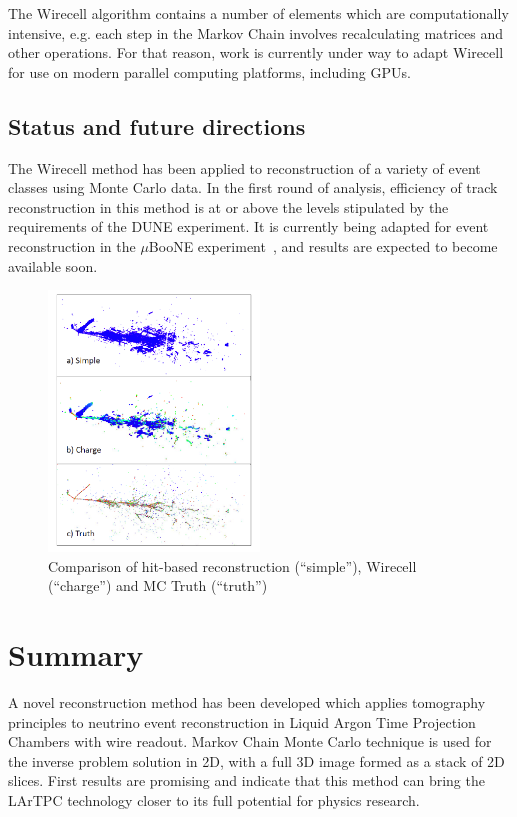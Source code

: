 \documentclass[a4paper]{jpconf}
\begin{document}
The Wirecell algorithm contains a number of elements which are computationally intensive, e.g. each step in the Markov Chain involves recalculating
matrices and other operations. For that reason, work is currently under way to adapt Wirecell for use on modern parallel computing platforms,
including GPUs.

\subsection{Status and future directions}
The Wirecell method has been applied to reconstruction of a variety of event classes using Monte Carlo data. In the first round of analysis,
efficiency of track reconstruction in this method is at or above the levels stipulated by the requirements of the DUNE experiment.
It is currently being adapted for
event reconstruction in the $\mu$BooNE experiment~\cite{uboone}, and results are expected to become available soon.
\begin{figure}[h!]
	\centering
	\includegraphics[width=0.5\textwidth]{wirecell_vs_mc.png}
	\caption{Comparison of hit-based reconstruction (``simple''), Wirecell (``charge'') and MC Truth (``truth'')}
	\label{fig:wirecell_vs_mc}
\end{figure}



\section{Summary}
A novel reconstruction method has been developed which applies tomography principles to
neutrino event reconstruction in Liquid Argon Time Projection Chambers with
wire readout. Markov Chain Monte Carlo technique is used for the inverse problem solution in 2D, with a full 3D image formed as a stack of 2D slices.
First results are promising and indicate that this method can bring the LArTPC technology closer to its full potential for physics research.
\end{document}
